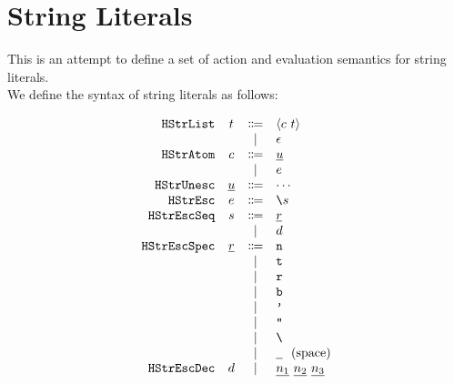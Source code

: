 \documentclass[12pt]{article}
\begin{document}
\section{String Literals}
This is an attempt to define a set of action and evaluation semantics for string literals. \\

\noindent We define the syntax of string literals as follows:
%
\begin{center}
  \vspace*{-1.5em}
  \[\begin{array}{rccl}
    \texttt{HStrList}    & t    & \Coloneqq & \langle c~t \rangle \\
                &                 & \mid         & \epsilon                            \\
    \texttt{HStrAtom}    & c    & \Coloneqq & \underline{u}                         \\
                &                 & \mid         & e                           \\
    \texttt{HStrUnesc}   & \underline{u}   & \Coloneqq & \cdots                                     \\
    \texttt{HStrEsc}     & e     & \Coloneqq & \texttt{\textbackslash}s              \\
    \texttt{HStrEscSeq}  & s  & \Coloneqq & \underline{r}                       \\
                &                 & \mid         & d                        \\
    \texttt{HStrEscSpec} & \underline{r} & \Coloneqq & \texttt{n}                                     \\
                &                 & \mid         & \texttt{t}                                     \\
                &                 & \mid         & \texttt{r}                                     \\
                &                 & \mid         & \texttt{b}                                     \\
                &                 & \mid         & \texttt{'}                                     \\
                &                 & \mid         & \texttt{"}                                     \\
                &                 & \mid         & \texttt{\textbackslash}                        \\
                &                 & \mid         & \texttt{\underline{\ }}~~\text{(space)}               \\ 
    \texttt{HStrEscDec}  & d  & \mid         & \underline{n_{1}}~\underline{n_{2}}~\underline{n_{3}}                          \\
  \end{array}\]
\end{center}
\end{document}
